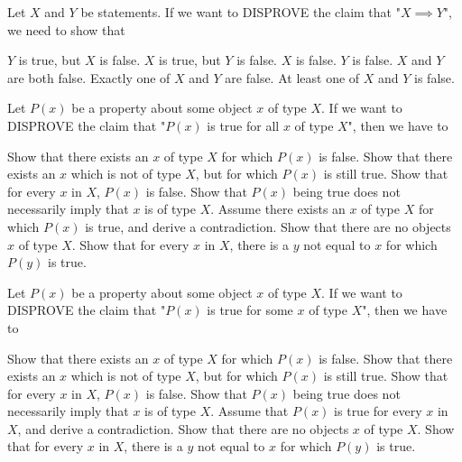 \documentclass[twoside,a4paper,leqno]{article}
\begin{document}
\begin{esercizi*}{}
\begin{exerm}
  Let $X$ and $Y$ be statements.  If we want to DISPROVE the claim that "$X \implies Y$", we need to show that
\begin{rispm}
\risp  $Y$ is true, but $X$ is false.
\risp[=] $X$ is true, but $Y$ is false.
\risp $X$ is false.
\risp $Y$ is false.
\risp $X$ and $Y$ are both false.
\risp Exactly one of $X$ and $Y$ are false.
\risp At least one of $X$ and $Y$ is false.
\end{rispm}
\end{exerm}

\begin{exerm}
  Let $P(x)$ be a property about some object $x$ of type $X$.  If we want to DISPROVE the claim that "$P(x)$ is true for all $x$ of type $X$", then we have to
\begin{rispm}
\risp[=]  Show that there exists an $x$ of type $X$ for which $P(x)$ is false.
\risp  Show that there exists an $x$ which is not of type $X$, but for which $P(x)$ is still true.
\risp  Show that for every $x$ in $X$, $P(x)$ is false.
\risp  Show that $P(x)$ being true does not necessarily imply that $x$ is of type $X$.
\risp  Assume there exists an $x$ of type $X$ for which $P(x)$ is true, and derive a contradiction.
\risp  Show that there are no objects $x$ of type $X$.
\risp  Show that for every $x$ in $X$, there is a $y$ not equal to $x$ for which $P(y)$ is true.
\end{rispm}
\end{exerm}

\begin{exerm}
  Let $P(x)$ be a property about some object $x$ of type $X$.  If we want to DISPROVE the claim that "$P(x)$ is true for some $x$ of type $X$", then we have to
\begin{rispm}
\risp  Show that there exists an $x$ of type $X$ for which $P(x)$ is false.
\risp  Show that there exists an $x$ which is not of type $X$, but for which $P(x)$ is still true.
\risp[=]  Show that for every $x$ in $X$, $P(x)$ is false.
\risp  Show that $P(x)$ being true does not necessarily imply that $x$ is of type $X$.
\risp  Assume that $P(x)$ is true for every $x$ in $X$, and derive a contradiction.
\risp[3.5]  Show that there are no objects $x$ of type $X$.
\risp  Show that for every $x$ in $X$, there is a $y$ not equal to $x$ for which $P(y)$ is true.
\end{rispm}
\end{exerm}


\end{esercizi*}
\end{document}

